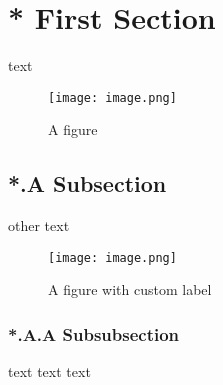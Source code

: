 \hypertarget{first-section}{%
\section{* First Section}\label{first-section}}

text

\begin{figure}
\hypertarget{fig:fig1}{%
\centering
\texttt{[image: image.png]}
\caption{A figure}\label{fig:fig1}
}
\end{figure}

\hypertarget{subsection}{%
\subsection{*.A Subsection}\label{subsection}}

other text

\begin{figure}
\hypertarget{fig:fig2}{%
\centering
\texttt{[image: image.png]}
\caption{A figure with custom label}\label{fig:fig2}
}
\end{figure}

\hypertarget{subsubsection}{%
\subsubsection{*.A.A Subsubsection}\label{subsubsection}}

text text text
